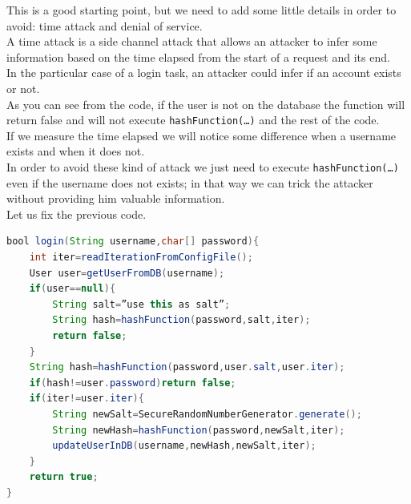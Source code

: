 This is a good starting point, but we need to add some little details in order to avoid: time attack and denial of service.\\
A time attack is a side channel attack that allows an attacker to infer some information based on the time elapsed from the start of a request and its end.\\
In the particular case of a login task, an attacker could infer if an account exists or not.\\
As you can see from the code, if the user is not on the database the function will return false and will not execute \texttt{hashFunction(…)} and the rest of the code.\\
If we measure the time elapsed we will notice some difference when a username exists and when it does not.\\
In order to avoid these kind of attack we just need to execute \texttt{hashFunction(…)} even if the username does not exists; in that way we can trick the attacker without providing him valuable information.\\
Let us fix the previous code.\\
\begin{lstlisting}[language=Java]
bool login(String username,char[] password){
	int iter=readIterationFromConfigFile();
	User user=getUserFromDB(username);
	if(user==null){
		String salt=”use this as salt”;
		String hash=hashFunction(password,salt,iter);
		return false;
	}
	String hash=hashFunction(password,user.salt,user.iter);
	if(hash!=user.password)return false;
	if(iter!=user.iter){
		String newSalt=SecureRandomNumberGenerator.generate();
		String newHash=hashFunction(password,newSalt,iter);
		updateUserInDB(username,newHash,newSalt,iter);
	}
	return true;
}
\end{lstlisting}


